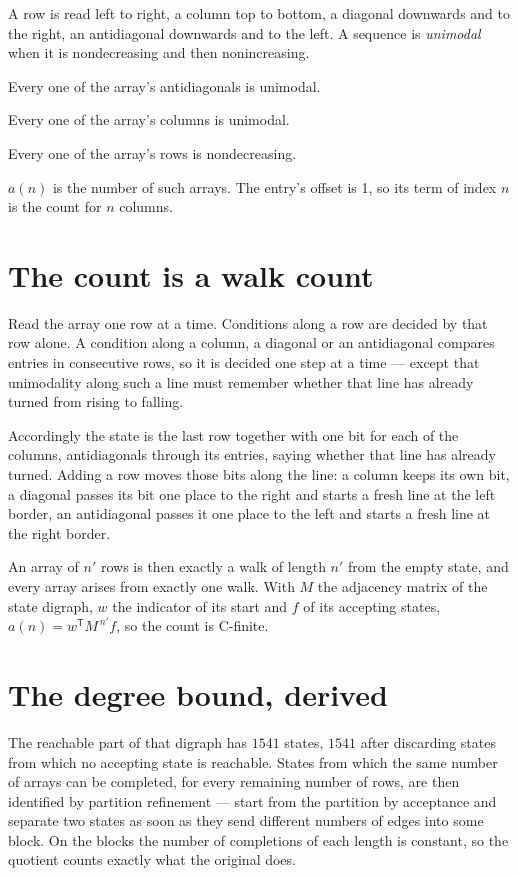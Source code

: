 \documentclass[11pt]{article}
\theoremstyle{definition}
\begin{document}
A row is read left to right, a column top to bottom, a diagonal downwards and to the right, an antidiagonal downwards and to the left. A sequence is {\itshape unimodal} when it is nondecreasing and then nonincreasing.

Every one of the array's antidiagonals is unimodal.

Every one of the array's columns is unimodal.

Every one of the array's rows is nondecreasing.

$a(n)$ is the number of such arrays. The entry's offset is 1, so its term of index $n$ is the count for $n$ columns.

\section{The count is a walk count}

Read the array one row at a time. Conditions along a row are decided by that row alone. A condition along a column, a diagonal or an antidiagonal compares entries in consecutive rows, so it is decided one step at a time --- except that unimodality along such a line must remember whether that line has already turned from rising to falling.

Accordingly the state is the last row together with one bit for each of the columns, antidiagonals through its entries, saying whether that line has already turned. Adding a row moves those bits along the line: a column keeps its own bit, a diagonal passes its bit one place to the right and starts a fresh line at the left border, an antidiagonal passes it one place to the left and starts a fresh line at the right border.

An array of $n'$ rows is then exactly a walk of length $n'$ from the empty state, and every array arises from exactly one walk. With $M$ the adjacency matrix of the state digraph, $w$ the indicator of its start and $f$ of its accepting states, $a(n) = w^{\mathsf T}M^{\,n'}f$, so the count is C-finite.

\section{The degree bound, derived}

The reachable part of that digraph has $1541$ states, $1541$ after discarding states from which no accepting state is reachable. States from which the same number of arrays can be completed, for every remaining number of rows, are then identified by partition refinement --- start from the partition by acceptance and separate two states as soon as they send different numbers of edges into some block. On the blocks the number of completions of each length is constant, so the quotient counts exactly what the original does.
\end{document}
